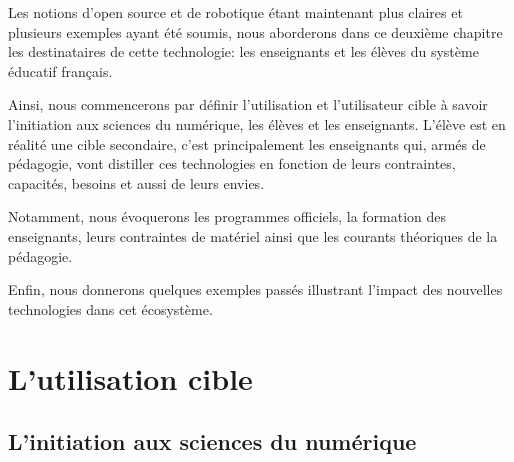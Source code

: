 \begin{resumChap}
Les notions d'open source et de robotique étant maintenant plus claires et plusieurs exemples ayant été soumis, nous aborderons dans ce deuxième chapitre les destinataires de cette technologie: les enseignants et les élèves du système éducatif français.\par%
Ainsi, nous commencerons par définir l'utilisation et l'utilisateur cible à savoir l'initiation aux sciences du numérique, les élèves et les enseignants. L'élève est en réalité une cible secondaire, c'est principalement les enseignants qui, armés de pédagogie, vont distiller ces technologies en fonction de leurs contraintes, capacités, besoins et aussi de leurs envies. \par%
Notamment, nous évoquerons les programmes officiels, la formation des enseignants, leurs contraintes de matériel ainsi que les courants théoriques de la pédagogie.\par%
Enfin, nous donnerons quelques exemples passés illustrant l'impact des nouvelles technologies dans cet écosystème.
\end{resumChap}
\section{L'utilisation cible}\label{sec:user_cible}
    \subsection{L'initiation aux sciences du numérique}
